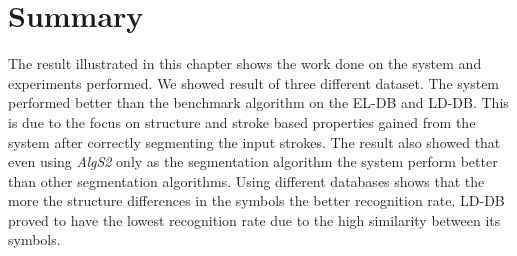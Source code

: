 \section{Summary}
\label{sec:ResultSummary}

The result illustrated in this chapter shows the work done on the system and experiments performed. We showed result of three different dataset. The system performed better than the benchmark algorithm on the EL-DB and LD-DB. This is due to the focus on structure and stroke based properties gained from the system after correctly segmenting the input strokes. The result also showed that even using \textsl{AlgS2} only as the segmentation algorithm the system perform better than other segmentation algorithms. Using different databases shows that the more the structure differences in the symbols the better recognition rate. LD-DB proved to have the lowest recognition rate due to the high similarity between its symbols.    %


